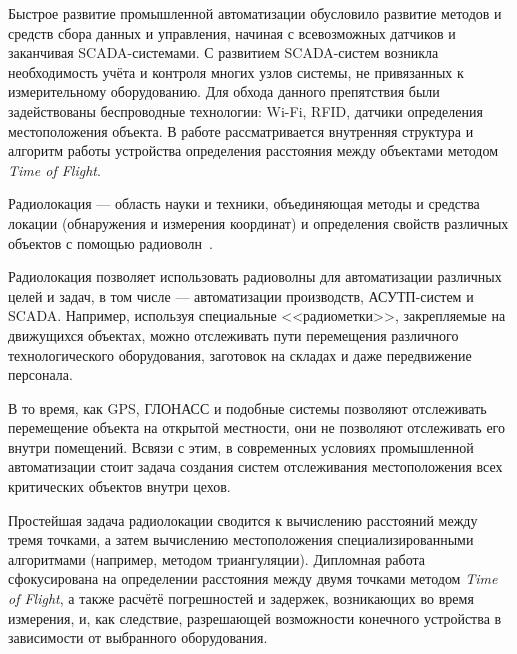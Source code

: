 Быстрое развитие промышленной автоматизации обусловило развитие методов и средств сбора данных и управления, начиная с всевозможных датчиков и заканчивая SCADA-системами. С развитием SCADA-систем возникла необходимость учёта и контроля многих узлов системы, не привязанных к измерительному оборудованию. Для обхода данного препятствия были задействованы беспроводные технологии: Wi-Fi, RFID, датчики определения местоположения объекта. В работе рассматривается внутренняя структура и алгоритм работы устройства определения расстояния между объектами методом \textit{Time of Flight}.

Радиолокация --- область науки и техники, объединяющая методы и средства локации (обнаружения и измерения координат) и определения свойств различных объектов с помощью радиоволн~\cite{wiki:radiolocation}.

Радиолокация позволяет использовать радиоволны для автоматизации различных целей и задач, в том числе --- автоматизации производств, АСУТП-систем и SCADA. Например, используя специальные <<радиометки>>, закрепляемые на движущихся объектах, можно отслеживать пути перемещения различного технологического оборудования, заготовок на складах и даже передвижение персонала.

В то время, как GPS, ГЛОНАСС и подобные системы позволяют отслеживать перемещение объекта на открытой местности, они не позволяют отслеживать его внутри помещений. Всвязи с этим, в современных условиях промышленной автоматизации стоит задача создания систем отслеживания местоположения всех критических объектов внутри цехов.

Простейшая задача радиолокации сводится к вычислению расстояний между тремя точками, а затем вычислению местоположения специализированными алгоритмами (например, методом триангуляции). Дипломная работа сфокусирована на определении расстояния между двумя точками методом \textit{Time of Flight}, а также расчётё погрешностей и задержек, возникающих во время измерения, и, как следствие, разрешающей возможности конечного устройства в зависимости от выбранного оборудования.
